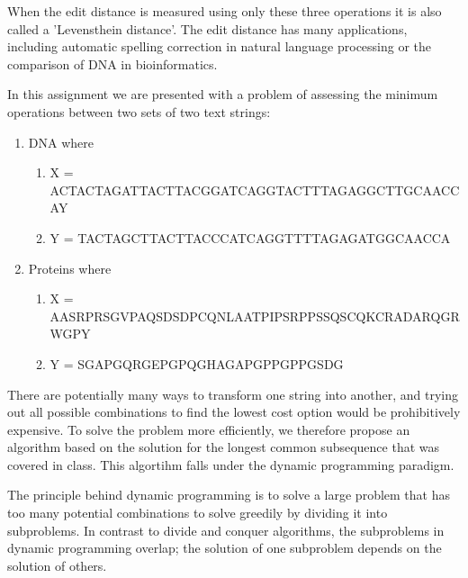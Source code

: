 \documentclass[11pt]{article}
\providecommand{\tightlist}{%
      \setlength{\itemsep}{0pt}\setlength{\parskip}{0pt}}
\begin{document}
When the edit distance is measured using only these three operations it
is also called a 'Levensthein distance'. The edit distance has many
applications, including automatic spelling correction in natural
language processing or the comparison of DNA in bioinformatics.

In this assignment we are presented with a problem of assessing the
minimum operations between two sets of two text strings:

\begin{enumerate}
\def\labelenumi{\arabic{enumi}.}
\tightlist
\item
  DNA where

  \begin{enumerate}
  \def\labelenumii{\alph{enumii})}
  \tightlist
  \item
    X = ACTACTAGATTACTTACGGATCAGGTACTTTAGAGGCTTGCAACCAY
  \item
    Y = TACTAGCTTACTTACCCATCAGGTTTTAGAGATGGCAACCA
  \end{enumerate}
\item
  Proteins where

  \begin{enumerate}
  \def\labelenumii{\alph{enumii})}
  \tightlist
  \item
    X = AASRPRSGVPAQSDSDPCQNLAATPIPSRPPSSQSCQKCRADARQGRWGPY
  \item
    Y = SGAPGQRGEPGPQGHAGAPGPPGPPGSDG
  \end{enumerate}
\end{enumerate}

There are potentially many ways to transform one string into another,
and trying out all possible combinations to find the lowest cost option
would be prohibitively expensive. To solve the problem more efficiently,
we therefore propose an algorithm based on the solution for the longest
common subsequence that was covered in class. This algortihm falls under
the dynamic programming paradigm.

The principle behind dynamic programming is to solve a large problem
that has too many potential combinations to solve greedily by dividing
it into subproblems. In contrast to divide and conquer algorithms, the
subproblems in dynamic programming overlap; the solution of one
subproblem depends on the solution of others.
\end{document}
